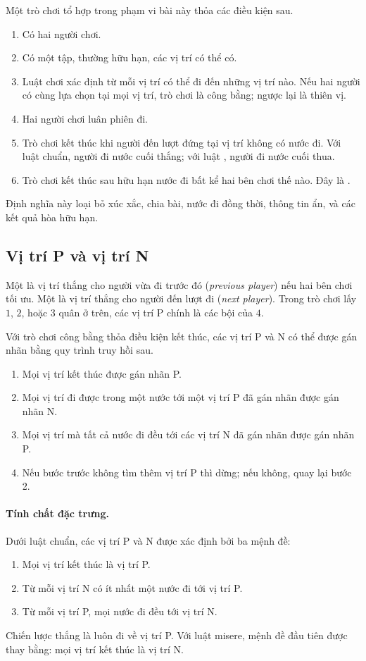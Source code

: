 \documentclass[11pt]{article}
\begin{document}
Một trò chơi tổ hợp trong phạm vi bài này thỏa các điều kiện sau.
\begin{enumerate}
  \item Có hai người chơi.
  \item Có một tập, thường hữu hạn, các vị trí có thể có.
  \item Luật chơi xác định từ mỗi vị trí có thể đi đến những vị trí nào. Nếu
  hai người có cùng lựa chọn tại mọi vị trí, trò chơi là công bằng; ngược lại
  là thiên vị.
  \item Hai người chơi luân phiên đi.
  \item Trò chơi kết thúc khi người đến lượt đứng tại vị trí không có nước đi.
  Với luật chuẩn, người đi nước cuối thắng; với luật , người đi
  nước cuối thua.
  \item Trò chơi kết thúc sau hữu hạn nước đi bất kể hai bên chơi thế nào. Đây
  là .
\end{enumerate}

Định nghĩa này loại bỏ xúc xắc, chia bài, nước đi đồng thời, thông tin ẩn, và
các kết quả hòa hữu hạn.

\subsection{Vị trí P và vị trí N}

Một  là vị trí thắng cho người vừa đi trước đó
(\textit{previous player}) nếu hai bên chơi tối ưu. Một  là vị
trí thắng cho người đến lượt đi (\textit{next player}). Trong trò chơi lấy
\(1\), \(2\), hoặc \(3\) quân ở trên, các vị trí P chính là các bội của \(4\).

Với trò chơi công bằng thỏa điều kiện kết thúc, các vị trí P và N có thể được
gán nhãn bằng quy trình truy hồi sau.
\begin{enumerate}
  \item Mọi vị trí kết thúc được gán nhãn P.
  \item Mọi vị trí đi được trong một nước tới một vị trí P đã gán nhãn được
  gán nhãn N.
  \item Mọi vị trí mà tất cả nước đi đều tới các vị trí N đã gán nhãn được gán
  nhãn P.
  \item Nếu bước trước không tìm thêm vị trí P thì dừng; nếu không, quay lại
  bước 2.
\end{enumerate}

\paragraph{Tính chất đặc trưng.}
Dưới luật chuẩn, các vị trí P và N được xác định bởi ba mệnh đề:
\begin{enumerate}
  \item Mọi vị trí kết thúc là vị trí P.
  \item Từ mỗi vị trí N có ít nhất một nước đi tới vị trí P.
  \item Từ mỗi vị trí P, mọi nước đi đều tới vị trí N.
\end{enumerate}
Chiến lược thắng là luôn đi về vị trí P. Với luật misere, mệnh đề đầu tiên
được thay bằng: mọi vị trí kết thúc là vị trí N.
\end{document}
